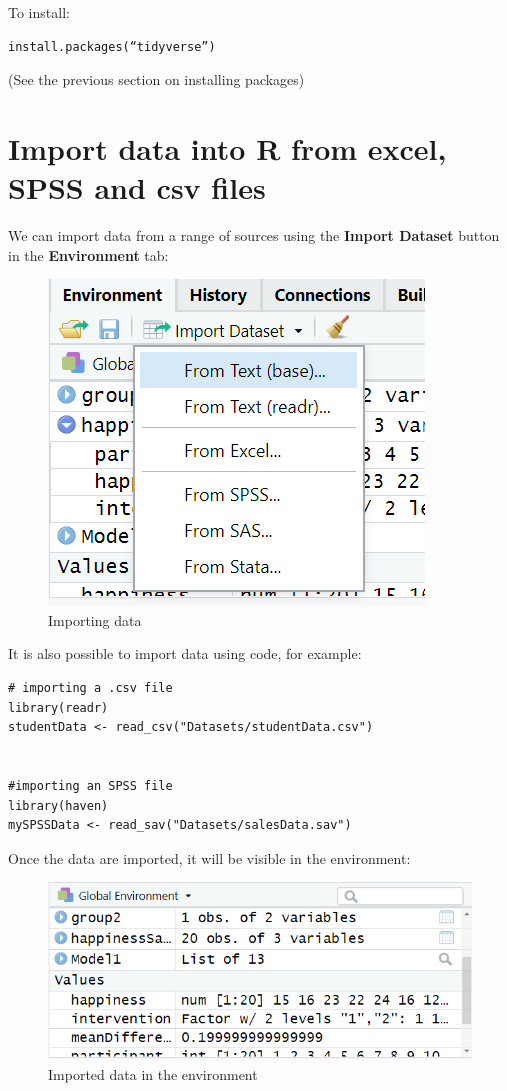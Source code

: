 \documentclass[
]{book}
\begin{document}
To install:

\begin{verbatim}
install.packages(“tidyverse”)
\end{verbatim}

(See the previous section on installing packages)

\hypertarget{import-data-into-r-from-excel-spss-and-csv-files}{%
\section{Import data into R from excel, SPSS and csv files}\label{import-data-into-r-from-excel-spss-and-csv-files}}

We can import data from a range of sources using the \textbf{Import Dataset} button in the \textbf{Environment} tab:

\begin{figure}
\centering
\includegraphics{images/importData.png}
\caption{Importing data}
\end{figure}

It is also possible to import data using code, for example:

\begin{verbatim}
# importing a .csv file
library(readr)
studentData <- read_csv("Datasets/studentData.csv")


#importing an SPSS file
library(haven)
mySPSSData <- read_sav("Datasets/salesData.sav")
\end{verbatim}

Once the data are imported, it will be visible in the environment:

\begin{figure}
\centering
\includegraphics{images/environment.png}
\caption{Imported data in the environment}
\end{figure}
\end{document}
